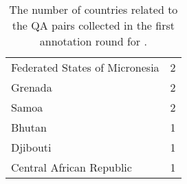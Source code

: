 {\begin{table}[ht!]
\begin{minipage}[t]{0.50\textwidth}
\begin{tabular}{lr}
        Federated States of Micronesia & 2 \\
        Grenada & 2 \\
        Samoa & 2 \\
        Bhutan & 1 \\
        Djibouti & 1 \\
        Central African Republic & 1 \\
        \bottomrule
        \end{tabular}
    \end{minipage}
    \caption{The number of countries related to the QA pairs collected in the first annotation round for \sivqa.}
    \label{tab:sivqa:anno:first_round}
\end{table}
}
